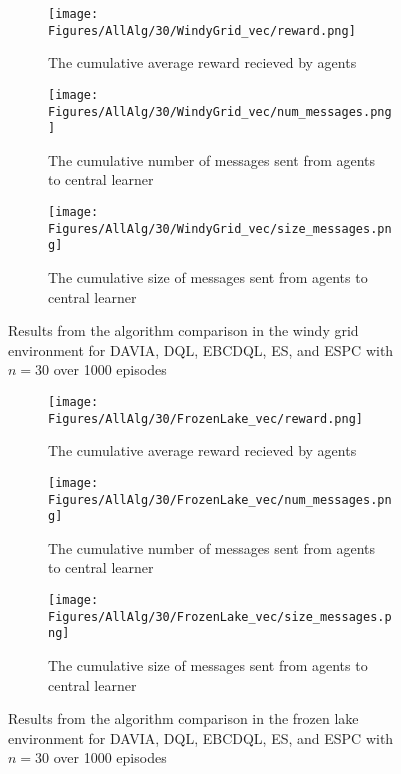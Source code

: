 \begin{figure}
    \centering
    \begin{subfigure}{0.5\textwidth}
        \centering
        \texttt{[image: Figures/AllAlg/30/WindyGrid\_vec/reward.png]}
        \caption{The cumulative average reward recieved by agents}
        \label{fig:AlgsWGReward}
    \end{subfigure}
    \begin{subfigure}{0.5\textwidth}
        \centering
        \texttt{[image: Figures/AllAlg/30/WindyGrid\_vec/num\_messages.png]}
        \caption{The cumulative number of messages sent from agents to central learner}
        \label{fig:AlgsWGNumMessages}
    \end{subfigure}
    \begin{subfigure}{0.5\textwidth}
        \centering
        \texttt{[image: Figures/AllAlg/30/WindyGrid\_vec/size\_messages.png]}
        \caption{The cumulative size of messages sent from agents to central learner}
        \label{fig:AlgsWGSizeMessages}
    \end{subfigure}
    \caption{Results from the algorithm comparison in the windy grid environment for DAVIA, DQL, EBCDQL, ES, and ESPC with $n=30$ over 1000 episodes}
    \label{fig:AlgsWG}
\end{figure}

\begin{figure}
    \centering
    \begin{subfigure}{0.5\textwidth}
        \centering
        \texttt{[image: Figures/AllAlg/30/FrozenLake\_vec/reward.png]}
        \caption{The cumulative average reward recieved by agents}
        \label{fig:AlgsFLReward}
    \end{subfigure}
    \begin{subfigure}{0.5\textwidth}
        \centering
        \texttt{[image: Figures/AllAlg/30/FrozenLake\_vec/num\_messages.png]}
        \caption{The cumulative number of messages sent from agents to central learner}
        \label{fig:AlgsFLNumMessages}
    \end{subfigure}
    \begin{subfigure}{0.5\textwidth}
        \centering
        \texttt{[image: Figures/AllAlg/30/FrozenLake\_vec/size\_messages.png]}
        \caption{The cumulative size of messages sent from agents to central learner}
        \label{fig:AlgsFLSizeMessages}
    \end{subfigure}
    \caption{Results from the algorithm comparison in the frozen lake environment for DAVIA, DQL, EBCDQL, ES, and ESPC with $n=30$ over 1000 episodes}
    \label{fig:AlgsFL}
\end{figure}

